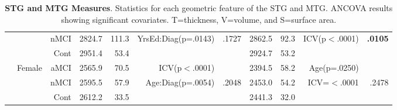 \documentclass[12pt]{article}
\newcommand\T{\rule{0pt}{2.6ex}}
\begin{document}
\begin{sidewaystable}
\begin{tabular}{l|rr|rrrr|rrrr}
							&						& nMCI & 2824.7 & 111.3 & YrsEd:Diag(p=.0143) & .1727  & 2862.5 & 92.3 & ICV(p$<$.0001) & \textbf{.0105}\\
							&						& Cont & 2951.4 & 53.4 & &  & 2924.7 & 53.2 & &  \\\cline{2-11}
							&	\multirow{3}{*}{Female}	& aMCI\T & 2565.9 & 70.5 & ICV(p$<$.0001) &  & 2394.5 & 58.2 & Age(p=.0250) & \\
							&						& nMCI & 2595.5 & 57.9 & Age:Diag(p=.0054) & .2048  & 2453.0 & 54.2 & ICV=$<$.0001 & .2478\\
							&						& Cont & 2612.2 & 33.5 & & & 2441.3 & 32.0 & &\\
	
	\end{tabular}
	\caption{\textbf{STG and MTG Measures}.  Statistics for each geometric feature of the STG and MTG.  ANCOVA results showing significant covariates. T=thickness, V=volume, and S=surface area.}
	\label{Wave1.STG.MTG.ANCOVA}
\end{sidewaystable}
\end{document}
